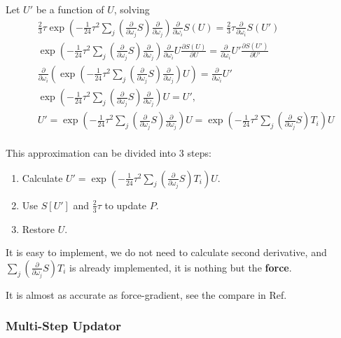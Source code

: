 Let $U'$ be a function of $U$, solving
\begin{equation}
\begin{split}
&\frac{2}{3}\tau \exp\left(-\frac{1}{24}\tau ^2 \sum _j\left(\frac{\partial}{\partial \omega _j}S\right)\frac{\partial}{\partial \omega _j}\right)\frac{\partial}{\partial \omega_i}S(U)=\frac{2}{3}\tau\frac{\partial}{\partial \omega _i}S(U')\\
&\exp\left(-\frac{1}{24}\tau ^2 \sum _j\left(\frac{\partial}{\partial \omega _j}S\right)\frac{\partial}{\partial \omega _j}\right)\frac{\partial}{\partial \omega_i}U\frac{\partial S(U)}{\partial U}=\frac{\partial}{\partial \omega _i}U'\frac{\partial S(U')}{\partial U'}\\
&\frac{\partial }{\partial \omega _i}\left(\exp\left(-\frac{1}{24}\tau ^2 \sum _j\left(\frac{\partial}{\partial \omega _j}S\right)\frac{\partial}{\partial \omega _j}\right)U\right)=\frac{\partial }{\partial \omega _i}U'\\
&\exp\left(-\frac{1}{24}\tau ^2 \sum _j\left(\frac{\partial}{\partial \omega _j}S\right)\frac{\partial}{\partial \omega _j}\right)U=U',\\
&U'=\exp\left(-\frac{1}{24}\tau ^2 \sum _j\left(\frac{\partial}{\partial \omega _j}S\right)\frac{\partial}{\partial \omega _j}\right)U=\exp\left(-\frac{1}{24}\tau ^2 \sum _j\left(\frac{\partial}{\partial \omega _j}S\right)T_i\right)U\\
\end{split}
\end{equation}

This approximation can be divided into 3 steps:

\begin{enumerate}
  \item Calculate $U'=\exp\left(-\frac{1}{24}\tau ^2 \sum _j\left(\frac{\partial}{\partial \omega _j}S\right)T_i\right)U$.
  \item Use $S[U']$ and $\frac{2}{3}\tau$ to update $P$.
  \item Restore $U$.
\end{enumerate}

It is easy to implement, we do not need to calculate second derivative, and $\sum _j\left(\frac{\partial}{\partial \omega _j}S\right)T_i$ is already implemented, it is nothing but the \textbf{force}.

It is almost as accurate as force-gradient, see the compare in Ref.~\cite{forcegradient3}

\subsubsection{\label{sec:MultiStepUpdator}Multi-Step Updator}



